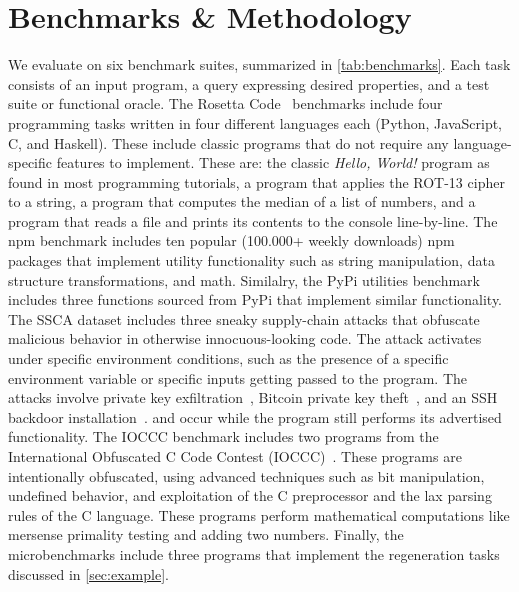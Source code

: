 \documentclass[a4paper,twoside,12pt]{report} %
\begin{document}
\section{Benchmarks \& Methodology}

We evaluate \sys on six benchmark suites, summarized in \cref{tab:benchmarks}.
Each task consists of an input program, a \sys query expressing desired
properties, and a test suite or functional oracle.
The Rosetta Code~\cite{rosettacode} benchmarks include four programming tasks written in four different
languages each (Python, JavaScript, C, and Haskell). 
These include classic programs that do not require any language-specific features to implement.
These are: the classic \emph{Hello, World!} program as found in most programming tutorials,
a program that applies the ROT-13 cipher to a string,
a program that computes the median of a list of numbers,
and a program that reads a file and prints its contents to the console line-by-line.
The npm benchmark includes ten popular (100.000+ weekly downloads) npm packages that implement utility
functionality such as string manipulation, data structure transformations, and math.
Similalry, the PyPi utilities benchmark includes three functions sourced from PyPi that implement similar functionality.
The SSCA dataset includes three sneaky supply-chain attacks that obfuscate malicious behavior in otherwise innocuous-looking code.
The attack activates under specific environment conditions, such as the presence of a specific environment variable or specific inputs
getting passed to the program. The attacks involve private key exfiltration~\cite{ohm2020backstabber}, Bitcoin private key theft~\cite{ev:eurosec:2022}, and an SSH backdoor installation~\cite{copeland2019frightening}.
and occur while the program still performs its advertised functionality.
The IOCCC benchmark includes two programs from the International Obfuscated C Code Contest (IOCCC)~\cite{ioccc}.
These programs are intentionally obfuscated, using advanced techniques such as bit manipulation, undefined behavior,
and exploitation of the C preprocessor and the lax parsing rules of the C language.
These programs perform mathematical computations like mersense primality testing and adding two numbers.
Finally, the microbenchmarks include three programs that implement the regeneration tasks discussed in \cref{sec:example}.
\end{document}
